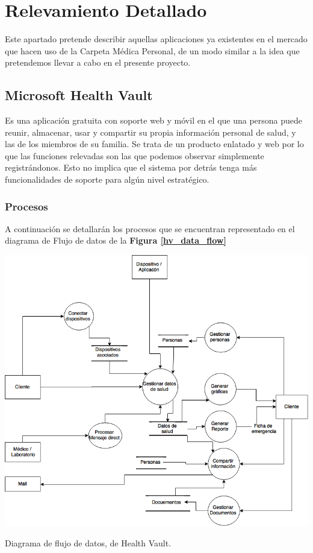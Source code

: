 \clearpage
\section{Relevamiento Detallado}
Este apartado pretende describir aquellas aplicaciones ya existentes en el mercado que hacen uso de la Carpeta Médica Personal, de un modo similar a la idea que pretendemos llevar a cabo en el presente proyecto.


\subsection{Microsoft Health Vault}
	 Es una aplicación gratuita con soporte web y móvil en el que una persona puede reunir, almacenar, usar y compartir su propia información personal de salud, y las de los miembros de su familia. Se trata de un producto enlatado y web por lo que las funciones relevadas son las que podemos observar simplemente registrándonos.
     Esto no implica que el sistema por detrás tenga más funcionalidades de soporte para algún nivel estratégico.
{\correccionTexto	
\subsubsection{Procesos}
A continuación se detallarán los procesos que se encuentran representado en el diagrama de Flujo de datos de la \textbf{Figura \ref{hv_data_flow}}
}
	\begin{correccionFigure}[h]
      \centering
      \includegraphics[width=.8\textwidth]{img/tp1/hv_flujo_de_datos}
      \caption{Diagrama de flujo de datos, de Health Vault.}
      \label{hv_data_flow}
    \end{correccionFigure} 



